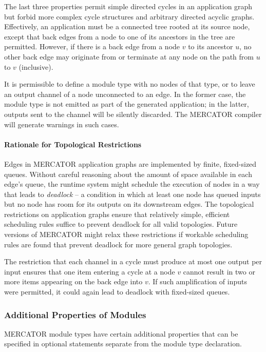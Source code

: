\documentclass[11pt]{article}
\begin{document}
The last three properties permit simple directed cycles in an
application graph but forbid more complex cycle structures and
arbitrary directed acyclic graphs.  Effectively, an application must
be a connected tree rooted at its source node, except that back edges
from a node to one of its ancestors in the tree are permitted.
However, if there is a back edge from a node $v$ to its ancestor $u$,
no other back edge may originate from or terminate at any node on the
path from $u$ to $v$ (inclusive).

It is permissible to define a module type with no nodes of that type,
or to leave an output channel of a node unconnected to an edge. In the
former case, the module type is not emitted as part of the generated
application; in the latter, outputs sent to the channel will be
silently discarded. The MERCATOR compiler will generate warnings in
such cases.

\paragraph*{Rationale for Topological Restrictions}
Edges in MERCATOR application graphs are implemented by finite,
fixed-sized queues.  Without careful reasoning about the amount of
space available in each edge's queue, the runtime system might
schedule the execution of nodes in a way that leads to \emph{deadlock}
-- a condition in which at least one node has queued inputs but no
node has room for its outputs on its downstream edges.  The
topological restrictions on application graphs ensure that relatively
simple, efficient scheduling rules suffice to prevent deadlock for all
valid topologies.  Future versions of MERCATOR might relax these
restrictions if workable scheduling rules are found that prevent
deadlock for more general graph topologies.

The restriction that each channel in a cycle must produce at most one
output per input ensures that one item entering a cycle at a node $v$
cannot result in two or more items appearing on the back edge into
$v$.  If such amplification of inputs were permitted, it could again
lead to deadlock with fixed-sized queues.

\subsubsection{Additional Properties of Modules}

MERCATOR module types have certain additional properties that can be
specified in optional statements separate from the module type
declaration.
\end{document}
